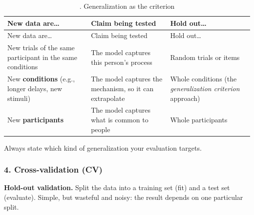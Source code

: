 \begin{longtable}[]{@{}
  >{\raggedright\arraybackslash}p{}
  >{\raggedright\arraybackslash}p{}
  >{\raggedright\arraybackslash}p{}@{}}
\caption{. Generalization as the criterion}\tabularnewline
\toprule\noalign{}
\begin{minipage}[b]{\linewidth}\raggedright
New data are\ldots{}
\end{minipage} & \begin{minipage}[b]{\linewidth}\raggedright
Claim being tested
\end{minipage} & \begin{minipage}[b]{\linewidth}\raggedright
Hold out\ldots{}
\end{minipage} \\
\midrule\noalign{}
\endfirsthead
\toprule\noalign{}
\begin{minipage}[b]{\linewidth}\raggedright
New data are\ldots{}
\end{minipage} & \begin{minipage}[b]{\linewidth}\raggedright
Claim being tested
\end{minipage} & \begin{minipage}[b]{\linewidth}\raggedright
Hold out\ldots{}
\end{minipage} \\
\midrule\noalign{}
\endhead
\bottomrule\noalign{}
\endlastfoot
New trials of the same participant in the same conditions & The model
captures this person's process & Random trials or items \\
New \textbf{conditions} (e.g., longer delays, new stimuli) & The model
captures the mechanism, so it can extrapolate & Whole conditions (the
\emph{generalization criterion} approach) \\
New \textbf{participants} & The model captures what is common to people
& Whole participants \\
\end{longtable}

Always state which kind of generalization your evaluation targets.

\subsubsection{4. Cross-validation (CV)}

\textbf{Hold-out validation.} Split the data into a training set (fit)
and a test set (evaluate). Simple, but wasteful and noisy: the result
depends on one particular split.

